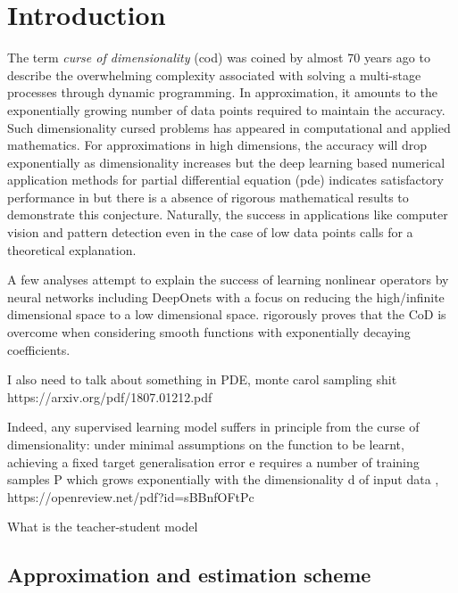 \chapter{Introduction}
\label{ch:introduction}

The term \textit{curse of dimensionality} (\gls{cod}) was coined by
\cite{bellmanTheoryDynamicProgramming1952} almost 70 years ago to describe the
overwhelming complexity associated with solving a multi-stage processes through
dynamic programming. In approximation, it amounts to the exponentially growing
number of data points required to maintain the accuracy. Such dimensionality
cursed problems has appeared in computational and applied mathematics. For
approximations in high dimensions, the accuracy will drop exponentially as
dimensionality increases but the deep learning based numerical application
methods for partial differential equation (\gls{pde}) indicates satisfactory
performance in \cite{eDeepRitzMethod2017,
eDeepLearningbasedNumerical2017,beckMachineLearningApproximation2019} but there
is a absence of rigorous mathematical results to demonstrate this conjecture.
Naturally, the success in applications like computer vision and pattern
detection even in the case of low data points calls for a theoretical
explanation.
 
A few analyses attempt to explain the success of learning nonlinear operators by
neural networks including DeepOnets with a focus on reducing the high/infinite
dimensional space to a low dimensional space.
\cite{lanthalerErrorEstimatesDeepOnets2022} rigorously proves that the CoD is
overcome when considering smooth functions with exponentially decaying
coefficients.

I also need to talk about something in PDE, monte carol sampling shit https://arxiv.org/pdf/1807.01212.pdf

Indeed, any supervised learning model suffers in principle from the curse of
dimensionality: under minimal assumptions on the function to be learnt,
achieving a fixed target generalisation error e requires a number of training
samples P which grows exponentially with the dimensionality d of input data ,
 https://openreview.net/pdf?id=sBBnfOFtPc

What is the teacher-student model

\section{Approximation and estimation scheme}


